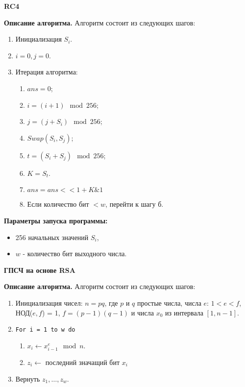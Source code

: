 \documentclass[spec, och, labwork]{shiza}
\begin{document}
\begin{center}
  \textbf{RC4}
\end{center}
\textbf{Описание алгоритма.} Алгоритм состоит из следующих шагов:
\begin{enumerate}
  \item Инициализация $S_i$.
  \item $i = 0, j = 0$.
  \item Итерация алгоритма:
    \begin{enumerate}
      \item $ans = 0$;
      \item $i = (i + 1) \mod 256$;
      \item $j = (j + S_i) \mod 256$;
      \item $Swap(S_i, S_j)$;
      \item $t = (S_i + S_j) \mod 256$;
      \item $K = S_t$.
      \item $ans = ans << 1 + K \& 1$
      \item Если количество бит $< w$, перейти к шагу б.
    \end{enumerate}
\end{enumerate}

\textbf{Параметры запуска программы:}
\begin{itemize}
  \item 256 начальных значений $S_i$,
  \item $w$ - количество бит выходного числа.
\end{itemize}

\begin{center}
  \textbf{ГПСЧ на основе RSA}
\end{center}
\textbf{Описание алгоритма.} Алгоритм состоит из следующих шагов:
\begin{enumerate}
  \item Инициализация чисел: $n = pq$, где $p$ и $q$ простые числа, числа $e$: $1 < e < f$, НОД($e, f$) = 1, $f = (p - 1)(q - 1)$ и числа $x_0$ из интервала $[1, n - 1]$.
  \item \texttt{For i = 1 to w do}
        \begin{enumerate}
          \item $x_i \leftarrow x_{i-1}^e \mod n$.
          \item $z_i \leftarrow $ последний значащий бит $x_i$
        \end{enumerate}
  \item Вернуть $z_1, \dots, z_w$.
\end{enumerate}
\end{document}
